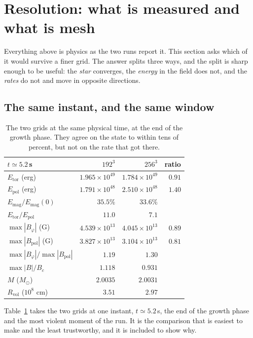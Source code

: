 \documentclass[11pt,a4paper]{article}
\newcommand{\Msun}{M_\odot}
\newcommand{\Rvol}{R_{\mathrm{vol}}}
\newcommand{\Btor}{B_\varphi}
\newcommand{\Bpol}{B_{\mathrm{pol}}}
\newcommand{\Etor}{E_{\mathrm{tor}}}
\newcommand{\Epol}{E_{\mathrm{pol}}}
\newcommand{\Emag}{E_{\mathrm{mag}}}
\begin{document}
\section{Resolution: what is measured and what is mesh}
\label{sec:conv}

Everything above is physics as the two runs report it. This section asks which
of it would survive a finer grid. The answer splits three ways, and the split is
sharp enough to be useful: the \emph{star} converges, the \emph{energy} in the
field does not, and the \emph{rates} do not and move in opposite directions.

\subsection{The same instant, and the same window}


\begin{table}[h]
\centering\small
\begin{tabular}{lrrr}
\toprule
$t \simeq 5.2$\,s & $192^3$ & $256^3$ & ratio \\
\midrule
$\Etor$ (erg) & $1.965\times10^{49}$ & $1.784\times10^{49}$ & $0.91$ \\
$\Epol$ (erg) & $1.791\times10^{48}$ & $2.510\times10^{48}$ & $1.40$ \\
$\Emag/\Emag(0)$ & $35.5\%$ & $33.6\%$ & \\
$\Etor/\Epol$ & $11.0$ & $7.1$ & \\
$\max|\Btor|$ (G) & $4.539\times10^{13}$ & $4.045\times10^{13}$ & $0.89$ \\
$\max|\Bpol|$ (G) & $3.827\times10^{13}$ & $3.104\times10^{13}$ & $0.81$ \\
$\max|\Btor|/\max|\Bpol|$ & $1.19$ & $1.30$ & \\
$\max|B|/B_c$ & $1.118$ & $0.931$ & \\
$M$ ($\Msun$) & $2.0035$ & $2.0031$ & \\
$\Rvol$ ($10^8$ cm) & $3.51$ & $2.97$ & \\
\bottomrule
\end{tabular}
\caption{The two grids at the same physical time, at the end of the growth
phase. They agree on the state to within tens of percent, but not on the rate
that got there.}
\label{tab:same}
\end{table}


Table~\ref{tab:same} takes the two grids at one instant, $t \simeq 5.2$\,s, the
end of the growth phase and the most violent moment of the run. It is the
comparison that is easiest to make and the least trustworthy, and it is
included to show why.
\end{document}
